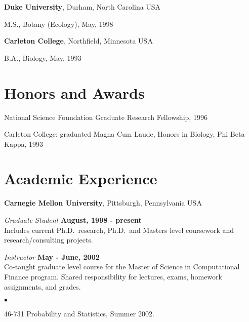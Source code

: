 \documentclass[margin,line]{res}
\newenvironment{list1}{
  \begin{list}{\ding{113}}{%
      \setlength{\itemsep}{0in}
      \setlength{\parsep}{0in} \setlength{\parskip}{0in}
      \setlength{\topsep}{0in} \setlength{\partopsep}{0in} 
      \setlength{\leftmargin}{0.17in}}}{\end{list}}
\newenvironment{list2}{
  \begin{list}{$\bullet$}{%
      \setlength{\itemsep}{0in}
      \setlength{\parsep}{0in} \setlength{\parskip}{0in}
      \setlength{\topsep}{0in} \setlength{\partopsep}{0in} 
      \setlength{\leftmargin}{0.2in}}}{\end{list}}
\begin{document}
\begin{resume}
{\bf Duke University}, Durham, North Carolina USA\\
\vspace*{-.1in}
\begin{list1}
\item[] M.S., Botany (Ecology),  May, 1998
\end{list1}

{\bf Carleton College}, Northfield, Minnesota USA\\
\vspace*{-.1in}
\begin{list1}
\item[] B.A., Biology,  May, 1993
\end{list1}


\section{\sc Honors and Awards} 
National Science Foundation Graduate Research Fellowship, 1996

%
\vspace*{-2.5mm}
Carleton College: graduated Magna Cum Laude, Honors in Biology, Phi Beta Kappa, 1993

\section{\sc Academic Experience}
{\bf Carnegie Mellon University}, Pittsburgh, Pennsylvania USA

\vspace{-.3cm}
{\em Graduate Student} \hfill {\bf August, 1998 - present}\\
Includes current Ph.D.~research, Ph.D.~and Masters level coursework and
research/consulting projects.

{\em Instructor} \hfill {\bf May - June, 2002}\\
Co-taught graduate level course for the Master of Science in
Computational Finance program.  Shared responsibility for lectures, exams,
homework assignments, and  grades.  
\vspace*{.05in}  
\begin{list2}
\item 46-731 Probability and Statistics, Summer 2002.
\end{list2}



\end{resume}
\end{document}
